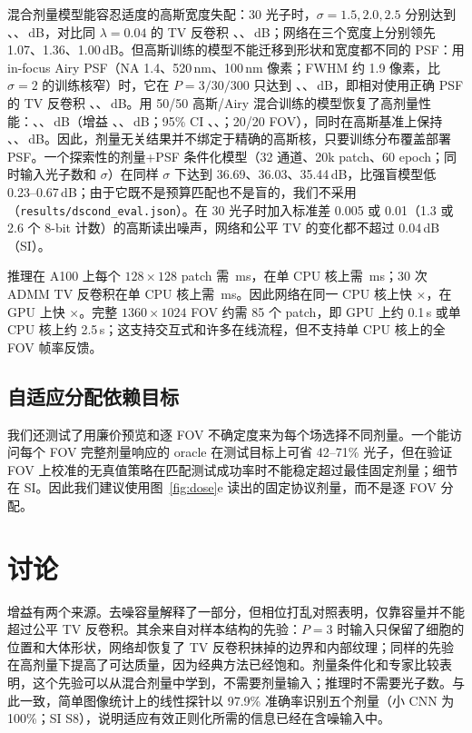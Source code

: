 \documentclass[11pt]{ctexart}
\begin{document}
混合剂量模型能容忍适度的高斯宽度失配：30 光子时，$\sigma=1.5,2.0,2.5$ 分别达到 \SigmaUPfifteen、\SigmaUPtwo、\SigmaUPtwopfive\,dB，对比同 $\lambda=0.04$ 的 TV 反卷积 \SigmaDecfifteen、\SigmaDectwo、\SigmaDectwopfive\,dB；网络在三个宽度上分别领先 1.07、1.36、1.00\,dB。但高斯训练的模型不能迁移到形状和宽度都不同的 PSF：用 in-focus Airy PSF（NA 1.4、520\,nm、100\,nm 像素；FWHM 约 1.9 像素，比 $\sigma=2$ 的训练核窄）时，它在 $P=3/30/300$ 只达到 \AiryStrongUThree、\AiryStrongUThirty、\AiryStrongUThreeHundred\,dB，即相对使用正确 PSF 的 TV 反卷积 \AiryStrongGainThree、\AiryStrongGainThirty、\AiryStrongGainThreeHundred\,dB。用 50/50 高斯/Airy 混合训练的模型恢复了高剂量性能：\AiryUThree、\AiryUThirty、\AiryUThreeHundred\,dB（增益 \AiryGainThree、\AiryGainThirty、\AiryGainThreeHundred\,dB；95\% CI \AiryCIThree、\AiryCIThirty、\AiryCIThreeHundred；20/20 FOV），同时在高斯基准上保持 \PsfMixGaussPThree、\PsfMixGaussPThirty、\PsfMixGaussPThreeHundred\,dB。因此，剂量无关结果并不绑定于精确的高斯核，只要训练分布覆盖部署 PSF。一个探索性的剂量+PSF 条件化模型（32 通道、20k patch、60 epoch；同时输入光子数和 $\sigma$）在同样 $\sigma$ 下达到 36.69、36.03、35.44\,dB，比强盲模型低 0.23--0.67\,dB；由于它既不是预算匹配也不是盲的，我们不采用（\texttt{results/dscond\_eval.json}）。在 30 光子时加入标准差 0.005 或 0.01（1.3 或 2.6 个 8-bit 计数）的高斯读出噪声，网络和公平 TV 的变化都不超过 0.04\,dB（SI）。

推理在 A100 上每个 $128\times128$ patch 需 \SpeedGPU\,ms，在单 CPU 核上需 \SpeedCPU\,ms；30 次 ADMM TV 反卷积在单 CPU 核上需 \SpeedTV\,ms。因此网络在同一 CPU 核上快 \SpeedFactorCPU$\times$，在 GPU 上快 \SpeedFactorGPU$\times$。完整 $1360\times1024$ FOV 约需 85 个 patch，即 GPU 上约 0.1\,s 或单 CPU 核上约 2.5\,s；这支持交互式和许多在线流程，但不支持单 CPU 核上的全 FOV 帧率反馈。

\subsection{自适应分配依赖目标}
我们还测试了用廉价预览和逐 FOV 不确定度来为每个场选择不同剂量。一个能访问每个 FOV 完整剂量响应的 oracle 在测试目标上可省 42--71\% 光子，但在验证 FOV 上校准的无真值策略在匹配测试成功率时不能稳定超过最佳固定剂量；细节在 SI。因此我们建议使用图~\ref{fig:dose}e 读出的固定协议剂量，而不是逐 FOV 分配。

\section{讨论}
增益有两个来源。去噪容量解释了一部分，但相位打乱对照表明，仅靠容量并不能超过公平 TV 反卷积。其余来自对样本结构的先验：$P=3$ 时输入只保留了细胞的位置和大体形状，网络却恢复了 TV 反卷积抹掉的边界和内部纹理；同样的先验在高剂量下提高了可达质量，因为经典方法已经饱和。剂量条件化和专家比较表明，这个先验可以从混合剂量中学到，不需要剂量输入；推理时不需要光子数。与此一致，简单图像统计上的线性探针以 97.9\% 准确率识别五个剂量（小 CNN 为 100\%；SI S8），说明适应有效正则化所需的信息已经在含噪输入中。
\end{document}
